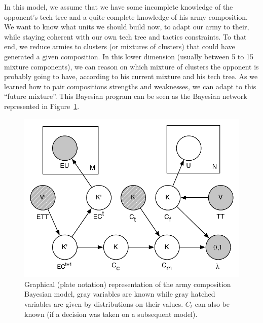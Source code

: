 In this model, we assume that we have some incomplete knowledge of the opponent's tech tree and a quite complete knowledge of his army composition. We want to know what units we should build now, to adapt our army to their, while staying coherent with our own tech tree and tactics constraints. To that end, we reduce armies to clusters (or mixtures of clusters) that could have generated a given composition. In this lower dimension (usually between 5 to 15 mixture components), %
we can reason on which mixture of clusters the opponent is probably going to have, according to his current mixture and his tech tree. As we learned how to pair compositions strengths and weaknesses, we can adapt to this ``future mixture''. This Bayesian program can be seen as the Bayesian network represented in Figure~\ref{BN}. %

\begin{figure}[htp]
\centerline{\includegraphics[width=0.55\columnwidth]{images/army_composition_model.pdf}}
\caption{Graphical (plate notation) representation of the army composition Bayesian model, gray variables are known while gray hatched variables are given by distributions on their values. $C_t$ can also be known (if a decision was taken on a subsequent model).}
\label{BN}
\end{figure}


